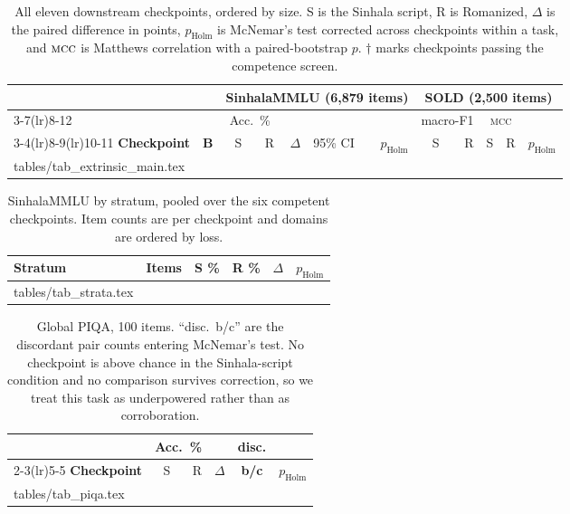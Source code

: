 \documentclass{article}
\makeatletter
\newcommand{\mcc}{\textsc{mcc}}
\newcommand{\rows}[1]{\@@input #1 }
\makeatother
\begin{document}
\begin{table}[t]
\caption{All eleven downstream checkpoints, ordered by size. S is the Sinhala script,
R is Romanized, $\Delta$ is the paired difference in points, $p_{\text{Holm}}$ is
McNemar's test corrected across checkpoints within a task, and $\mcc$ is Matthews
correlation with a paired-bootstrap $p$. $\dagger$ marks checkpoints passing the
competence screen.}
\label{tab:mainfull}
\centering\scriptsize
\setlength{\tabcolsep}{2.6pt}
\begin{tabular}{@{}lr rrr l r rr rr r@{}}
\toprule
& & \multicolumn{5}{c}{\textbf{SinhalaMMLU} (6{,}879 items)}
& \multicolumn{5}{c}{\textbf{SOLD} (2{,}500 items)} \\
\cmidrule(lr){3-7}\cmidrule(lr){8-12}
& & \multicolumn{2}{c}{Acc.\ \%} & & &
& \multicolumn{2}{c}{macro-F1} & \multicolumn{2}{c}{\mcc} & \\
\cmidrule(lr){3-4}\cmidrule(lr){8-9}\cmidrule(lr){10-11}
\textbf{Checkpoint} & \textbf{B} & S & R & $\Delta$ & 95\% CI & $p_{\text{Holm}}$
& S & R & S & R & $p_{\text{Holm}}$ \\
\midrule
\rows{tables/tab_extrinsic_main.tex}
\bottomrule
\end{tabular}
\end{table}

\begin{table}[t]
\caption{SinhalaMMLU by stratum, pooled over the six competent checkpoints. Item
counts are per checkpoint and domains are ordered by loss.}
\label{tab:strata}
\centering\small
\setlength{\tabcolsep}{4pt}
\begin{tabular}{@{}lrrrrr@{}}
\toprule
\textbf{Stratum} & \textbf{Items} & \textbf{S \%} & \textbf{R \%}
& \boldmath$\Delta$ & \boldmath$p_{\text{Holm}}$ \\
\midrule
\rows{tables/tab_strata.tex}
\bottomrule
\end{tabular}
\end{table}

\begin{table}[t]
\caption{Global PIQA, 100 items. ``disc.\ b/c'' are the discordant pair counts
entering McNemar's test. No checkpoint is above chance in the Sinhala-script
condition and no comparison survives correction, so we treat this task as
underpowered rather than as corroboration.}
\label{tab:piqa}
\centering\small
\setlength{\tabcolsep}{3.4pt}
\begin{tabular}{@{}lrrrcr@{}}
\toprule
& \multicolumn{2}{c}{Acc.\ \%} & & \textbf{disc.} & \\
\cmidrule(lr){2-3}\cmidrule(lr){5-5}
\textbf{Checkpoint} & S & R & \boldmath$\Delta$ & \textbf{b/c}
& \boldmath$p_{\text{Holm}}$ \\
\midrule
\rows{tables/tab_piqa.tex}
\bottomrule
\end{tabular}
\end{table}
\end{document}
